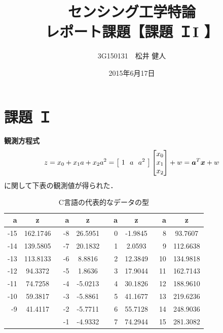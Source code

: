 \documentclass[a4paper]{jarticle}
\begin{document}
\title{センシング工学特論\\レポート課題【課題 ＩI 】}
\author{3G150131　松井 健人}
\date{2015年6月17日}
\maketitle


\section{課題 Ｉ }
\textbf{観測方程式}
\begin{equation}
z = x_0 + {x_1}a + {x_2}{a^2} = 
\left[  \ 1\ \ a\ \ a^2\   \right]
 \begin{bmatrix}
{x_0} \\ {x_1} \\{x_2} \\ 
\end{bmatrix}   + w= 
\mbox{\boldmath $a$}^{T}\mbox{\boldmath $x$} + w
\end{equation}
に関して下表の観測値が得られた．

\begin{table}[hbtp]
 \caption{C言語の代表的なデータの型}
 \label{table:data_type}
 \begin{center}
  \begin{tabular}{rc|rc|rc|rc}
   \hline
   a & z &　a & z &　a & z&　a & z \\
   \hline \hline
   -15 & 162.1746 & -8& 26.5951 & 0 & -1.9845  & 8 & 93.7607\\
   -14 & 139.5805 & -7 & 20.1832 & 1 & 2.0593  & 9 & 112.6638\\
   -13 & 113.8133 & -6 &  8.8816 & 2 & 12.3849  & 10 & 134.9818 \\
   -12 & 94.3372  & -5 &   1.8636 & 3 & 17.9044  & 11 &162.7143\\
   -11 & 74.7258  & -4 &  -5.0213& 4 & 30.1826  & 12 &188.9610 \\
   -10 & 59.3817  & -3 & -5.8861 & 5 & 41.1677  & 13 &219.6236 \\
   -9  & 41.4117   & -2 &   -5.7711& 6 & 55.7128 & 14 & 248.9036 \\
        &               & -1 &   -4.9332& 7&  74.2944  & 15 & 281.3082\\
   \hline
  \end{tabular}
 \end{center}
\end{table}
\end{document}
